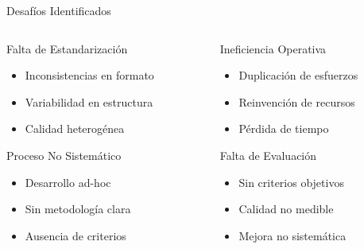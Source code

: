 \documentclass[10pt,aspectratio=169]{beamer}
\begin{document}
	\begin{frame}{Desafíos Identificados}
		\begin{columns}
			\begin{column}{0.5\textwidth}
				\begin{block}{Falta de Estandarización}
					\begin{itemize}
						\item Inconsistencias en formato
						\item Variabilidad en estructura
						\item Calidad heterogénea
					\end{itemize}
				\end{block}
				
				\begin{block}{Proceso No Sistemático}
					\begin{itemize}
						\item Desarrollo ad-hoc
						\item Sin metodología clara
						\item Ausencia de criterios
					\end{itemize}
				\end{block}
			\end{column}
			
			\begin{column}{0.5\textwidth}
				\begin{block}{Ineficiencia Operativa}
					\begin{itemize}
						\item Duplicación de esfuerzos
						\item Reinvención de recursos
						\item Pérdida de tiempo
					\end{itemize}
				\end{block}
				
				\begin{block}{Falta de Evaluación}
					\begin{itemize}
						\item Sin criterios objetivos
						\item Calidad no medible
						\item Mejora no sistemática
					\end{itemize}
				\end{block}
			\end{column}
		\end{columns}
	\end{frame}
	
\end{document}
